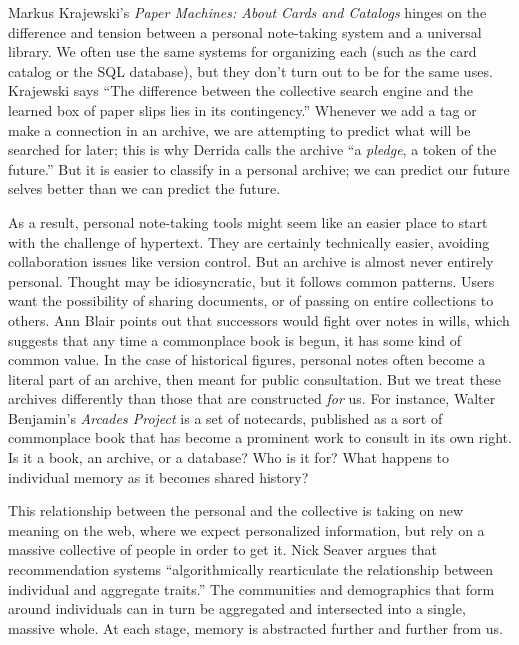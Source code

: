 Markus Krajewski's \emph{Paper Machines: About Cards and Catalogs} hinges on the difference and tension between a personal note-taking system and a universal library. We often use the same systems for organizing each (such as the card catalog or the SQL database), but they don't turn out to be for the same uses. Krajewski says ``The difference between the collective search engine and the learned box of paper slips lies in its contingency.''\autocite[50]{krajewski_paper_2011} Whenever we add a tag or make a connection in an archive, we are attempting to predict what will be searched for later; this is why Derrida calls the archive ``a \emph{pledge}, a token of the future.''\autocite[18]{derrida_archive_1995} But it is easier to classify in a personal archive; we can predict our future selves better than we can predict the future.

As a result, personal note-taking tools might seem like an easier place to start with the challenge of hypertext. They are certainly technically easier, avoiding collaboration issues like version control. But an archive is almost never entirely personal. Thought may be idiosyncratic, but it follows common patterns. Users want the possibility of sharing documents, or of passing on entire collections to others. Ann Blair points out that successors would fight over notes in wills, which suggests that any time a commonplace book is begun, it has some kind of common value.\autocite[104]{blair_note_2004} In the case of historical figures, personal notes often become a literal part of an archive, then meant for public consultation. But we treat these archives differently than those that are constructed \emph{for} us. For instance, Walter Benjamin's \emph{Arcades Project} is a set of notecards, published as a sort of commonplace book that has become a prominent work to consult in its own right. Is it a book, an archive, or a database? Who is it for? What happens to individual memory as it becomes shared history?

This relationship between the personal and the collective is taking on new meaning on the web, where we expect personalized information, but rely on a massive collective of people in order to get it. Nick Seaver argues that recommendation systems ``algorithmically rearticulate the relationship between individual and aggregate traits.''\autocite{seaver_algorithmic_2012} The communities and demographics that form around individuals can in turn be aggregated and intersected into a single, massive whole. At each stage, memory is abstracted further and further from us.

